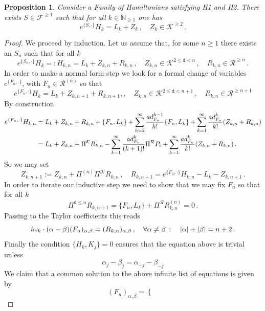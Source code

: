 \documentclass[10pt,a4paper]{amsart}
\newtheorem{prop}{Proposition}
\newcommand{\N}{\mathbb{N}}
\newcommand{\ad}{{\rm ad}}
\newcommand{\al}{{\alpha}}
\newcommand{\bt}{{\beta}}
\newcommand{\cF}{{\mathcal F}}
\newcommand{\cK}{{\mathcal K}}
\newcommand{\cR}{{\mathcal R}}
\newcommand{\im}{{\rm i}}
\newcommand{\td}{{\mathtt{d}}}
\begin{document}
\begin{prop}\label{formal-lin}Consider a Family of Hamiltonians satisfying H1 and H2.
	There exists $S\in  \cF^{\geq 1}$ such that for all $k\in \N_{\geq1}$ one has 
	\[
	e^{\{S,\cdot\}} H_k = L_k  + Z_k\,,\quad Z_k \in \cK^{\geq 2}\,.
	\]
\end{prop}

\begin{proof}
	We proceed by induction. Let us assume that, for some $n\geq 1$ there exists an $S_n$ such that
	for all $k$
	\[
	e^{\{S_n,\cdot\}} H_k=:H_{k,n}= L_k  + Z_{k,n}+ R_{k,n}\,,\quad Z_{k,n} \in \cK^{2\leq  \td < n}\,, \quad R_{k,n} \in \cR^{\geq n}\,.
	\]
	In order to make a normal form step we look for a formal change of variables $e^{\{F_n,\cdot\}}$, with $F_n\in \cR^{(n)}$ so that
	\[
	e^{\{F_n,\cdot\}} H_k = L_k  + Z_{k,n+1}+ R_{k,n+1 },,\quad Z_{k,n} \in \cK^{2\leq  \td < n+1}\,, \quad R_{k,n} \in \cR^{\geq n+1}
	\]
	By construction 
	\begin{align*}
		e^{\{F_n,\cdot\} }H_{k,n} &=L_k+ Z_{k,n} + R_{k,n} + \{F_n, L_k\} + \sum_{h=2}^\infty \frac{\ad_{F_n}^{h-1}}{h!} \{F_n,L_k \}
		+ \sum_{k=1}^\infty \frac{\ad_{F_n}^k}{k!}(Z_{k,n} + R_{k,n}) \\
		&= L_k+ Z_{k,n} + \Pi^\cK R_{k,n}  - \sum_{k=1}^\infty \frac{\ad_{F_n}^{k}}{(k+1)!}\Pi^{\cR}  P_{i}  + \sum_{k=1}^\infty \frac{\ad_{F_n}^k}{k!}(Z_{k,n} + R_{k,n})\,.
	\end{align*}
	So we may set
	\[
	Z_{k,n+1}:= Z_{k,n}+%
	\Pi^{(n)}\Pi^\cK R_{k,n} \,,\quad R_{k,n+1}= e^{\{F_n,\cdot\} }H_{k,n}- L_k - Z_{k,n+1}\,.
	\]
	In order to iterate our inductive step we need to show that we may fix $F_n$ so that for all $k$ 
	\[
	\Pi^{\td\leq  n} R_{k,n+1}= \{F_n,L_k\} + \Pi^\cR R_{k,n}^{(n)} =0\,.
	\]
	Passing to the Taylor coefficients this reads
	\begin{equation}
		\label{homotutte}
		\im \omega_k \cdot (\al-\bt)(F_n)_{\al,\bt} =(R_{k,n})_{\al,\bt} \,,\quad \forall \al\ne \bt\,:\quad |\al|+|\bt| =n+2\,.
	\end{equation}
	Finally the condition $\{H_k,K_j\}=0$ ensures that the equation above is trivial unless
	\begin{equation}
		\label{condk}
		{\al_j-\bt_j = \al_{-j} -\bt_{-j}}
	\end{equation}
	We claim that a  common solution to  the above infinite list of equations is given by
	\begin{equation}
		\label{questo}
		(F_n)_{\al,\bt} =\begin{cases}

\end{cases}
\end{equation}
\end{proof}
\end{document}
